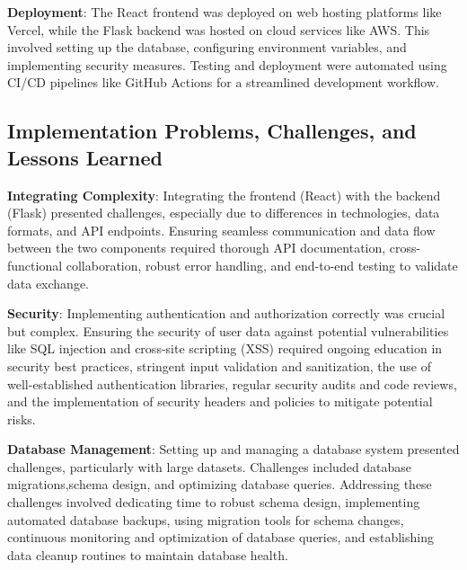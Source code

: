 \textbf{Deployment}: The React frontend was deployed on web hosting platforms like Vercel,
while the Flask backend was hosted on cloud services like AWS. This involved setting up
the database, configuring environment variables, and implementing security measures. %
Testing and deployment were automated using CI/CD pipelines like GitHub Actions for a
streamlined development workflow. %

\subsection{Implementation Problems, Challenges, and Lessons Learned}\label{subsec:implementation-problems-challenges-and-lessons-learned}

\textbf{Integrating Complexity}: Integrating the frontend (React) with the backend (Flask)
presented challenges, especially due to differences in technologies, data formats, and
API endpoints. %
Ensuring seamless communication and data flow between the two components required thorough API documentation, cross-functional collaboration, robust error handling,
and end-to-end testing to validate data exchange. %

\textbf{Security}: Implementing authentication and authorization correctly was crucial but
complex. %
Ensuring the security of user data against potential vulnerabilities like SQL injection and cross-site scripting (XSS) required ongoing education in security best
practices, stringent input validation and sanitization, the use of well-established
authentication libraries, regular security audits and code reviews, and the implementation
of security headers and policies to mitigate potential risks. %

\textbf{Database Management}: Setting up and managing a database system presented challenges,
particularly with large datasets. %
Challenges included database migrations,schema design, and optimizing database queries. %
Addressing these challenges involved dedicating time to robust schema design, implementing automated database backups, using
migration tools for schema changes, continuous monitoring and optimization of database
queries, and establishing data cleanup routines to maintain database health. %